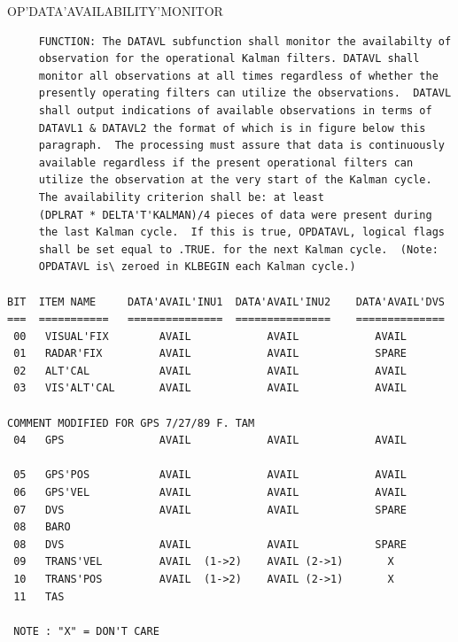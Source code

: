 \begin{frame}
OP'DATA'AVAILABILITY'MONITOR
\begin{verbatim}
     FUNCTION: The DATAVL subfunction shall monitor the availabilty of
     observation for the operational Kalman filters. DATAVL shall
     monitor all observations at all times regardless of whether the
     presently operating filters can utilize the observations.  DATAVL
     shall output indications of available observations in terms of 
     DATAVL1 & DATAVL2 the format of which is in figure below this
     paragraph.  The processing must assure that data is continuously
     available regardless if the present operational filters can 
     utilize the observation at the very start of the Kalman cycle.
     The availability criterion shall be: at least 
     (DPLRAT * DELTA'T'KALMAN)/4 pieces of data were present during
     the last Kalman cycle.  If this is true, OPDATAVL, logical flags
     shall be set equal to .TRUE. for the next Kalman cycle.  (Note:
     OPDATAVL is\ zeroed in KLBEGIN each Kalman cycle.)

BIT  ITEM NAME     DATA'AVAIL'INU1  DATA'AVAIL'INU2    DATA'AVAIL'DVS
===  ===========   ===============  ===============    ==============
 00   VISUAL'FIX        AVAIL            AVAIL            AVAIL
 01   RADAR'FIX         AVAIL            AVAIL            SPARE
 02   ALT'CAL           AVAIL            AVAIL            AVAIL
 03   VIS'ALT'CAL       AVAIL            AVAIL            AVAIL

COMMENT MODIFIED FOR GPS 7/27/89 F. TAM 
 04   GPS               AVAIL            AVAIL            AVAIL

 05   GPS'POS           AVAIL            AVAIL            AVAIL
 06   GPS'VEL           AVAIL            AVAIL            AVAIL
 07   DVS               AVAIL            AVAIL            SPARE
 08   BARO
 08   DVS               AVAIL            AVAIL            SPARE
 09   TRANS'VEL         AVAIL  (1->2)    AVAIL (2->1)       X
 10   TRANS'POS         AVAIL  (1->2)    AVAIL (2->1)       X
 11   TAS

 NOTE : "X" = DON'T CARE

\end{verbatim}
\end{frame}
